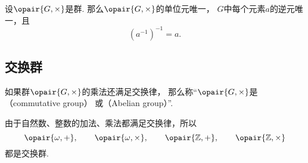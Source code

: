 \begin{property}
设\(\opair{G,\times}\)是群.
那么\(\opair{G,\times}\)的单位元唯一，
\(G\)中每个元素\(a\)的逆元唯一，且\[
    (a^{-1})^{-1} = a.
\]
\end{property}

\subsection{交换群}
\begin{definition}
如果群\(\opair{G,\times}\)的乘法还满足交换律，
那么称“\(\opair{G,\times}\)是（commutative group）%
或（Abelian group）”.
\end{definition}

由于自然数、整数的加法、乘法都满足交换律，所以\[
	\opair{\omega,+}, \qquad
	\opair{\omega,\times}, \qquad
	\opair{\mathbb{Z},+}, \qquad
	\opair{\mathbb{Z},\times}
\]都是交换群.
